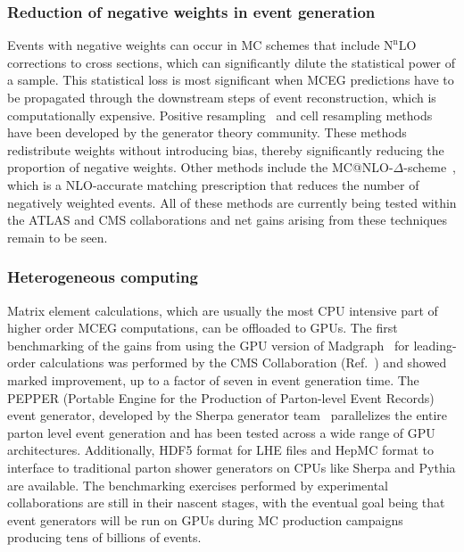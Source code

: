 \documentclass[10pt,a4paper]{article}
\begin{document}
\subsubsection{Reduction of negative weights in event
generation}\label{reduction-of-negative-weights-in-event-generation}

Events with negative weights can occur in MC schemes that include
$\mathrm{N}^\mathrm{n}\mathrm{LO}$ corrections to cross sections, which can significantly dilute
the statistical power of a sample. This statistical loss is most
significant when MCEG predictions have to be propagated through the
downstream steps of event reconstruction, which is computationally
expensive. Positive
resampling~\cite{Andersen:2020sjs} and
cell resampling
methods~\cite{Andersen:2021mvw} have been
developed by the generator theory community. These methods redistribute
weights without introducing bias, thereby significantly reducing the
proportion of negative weights. Other methods include the
MC@NLO-$\Delta$-scheme~\cite{Frederix:2020trv},
which is a NLO-accurate matching prescription that reduces the number of
negatively weighted events. All of these methods are currently being
tested within the ATLAS and CMS collaborations and net gains arising
from these techniques remain to be seen.

\subsubsection{Heterogeneous computing}\label{heterogeneous-computing}

Matrix element calculations, which are usually the most CPU intensive
part of higher order MCEG computations, can be offloaded to GPUs. The
first benchmarking of the gains from using the GPU version of
Madgraph~\cite{Alwall:2014hca,MadgraphOnGPU}
for leading-order calculations was performed by the CMS Collaboration
(Ref.~\cite{CMS-DP-2024-086}) and showed
marked improvement, up to a factor of seven in event generation time.
The PEPPER (Portable Engine for the Production of Parton-level Event
Records)~\cite{Bothmann:2023gew} event
generator, developed by the Sherpa generator
team~\cite{Sherpa:2019gpd} parallelizes
the entire parton level event generation and has been tested across a
wide range of GPU architectures. Additionally, HDF5 format for LHE files
and HepMC format to interface to traditional parton shower generators on
CPUs like Sherpa and Pythia are available. The benchmarking exercises
performed by experimental collaborations are still in their nascent
stages, with the eventual goal being that event generators will be run
on GPUs during MC production campaigns producing tens of billions of
events.
\end{document}

